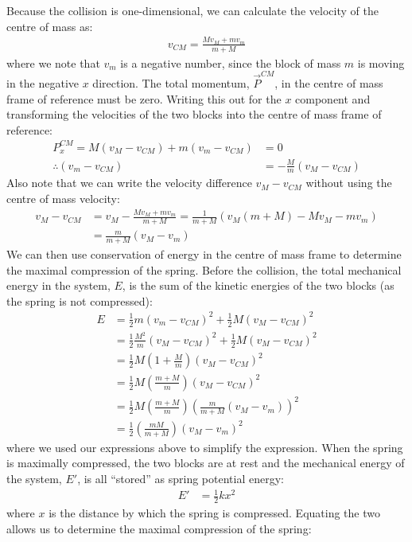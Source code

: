 \begin{example}
Because the collision is one-dimensional, we can calculate the velocity of the centre of mass as:
\begin{align*}
v_{CM} = \frac{Mv_M+mv_m}{m+M}
\end{align*}
where we note that $v_m$ is a negative number, since the block of mass $m$ is moving in the negative $x$ direction. The total momentum, $\vec P^{CM}$, in the centre of mass frame of reference must be zero. Writing this out for the $x$ component and transforming the velocities of the two blocks into the centre of mass frame of reference:
\begin{align*}
P^{CM}_x = M(v_M-v_{CM})+m(v_m-v_{CM})&=0\\
\therefore (v_m-v_{CM}) &= -\frac{M}{m}(v_M-v_{CM})
\end{align*}
Also note that we can write the velocity difference $v_M-v_{CM}$ without using the centre of mass velocity:
\begin{align*}
v_M-v_{CM} &= v_M-\frac{Mv_M+mv_m}{m+M}=\frac{1}{m+M}(v_M(m+M)-Mv_M-mv_m)\\
&=\frac{m}{m+M}(v_M-v_m)
\end{align*}
We can then use conservation of energy in the centre of mass frame to determine the maximal compression of the spring. Before the collision, the total mechanical energy in the system, $E$, is the sum of the kinetic energies of the two blocks (as the spring is not compressed):
\begin{align*}
E&=\frac{1}{2}m(v_m-v_{CM})^2+\frac{1}{2}M(v_M-v_{CM})^2\\
&=\frac{1}{2}\frac{M^2}{m}(v_M-v_{CM})^2+\frac{1}{2}M(v_M-v_{CM})^2\\
&=\frac{1}{2}M \left( 1 + \frac{M}{m}\right) (v_M-v_{CM})^2\\
&=\frac{1}{2}M \left(\frac{m+M}{m} \right)(v_M-v_{CM})^2\\
&=\frac{1}{2}M \left(\frac{m+M}{m} \right)\left(\frac{m}{m+M}(v_M-v_m)\right)^2\\
&=\frac{1}{2} \left(\frac{mM}{m+M}\right)(v_M-v_m)^2
\end{align*}
where we used our expressions above to simplify the expression. When the spring is maximally compressed, the two blocks are at rest and the mechanical energy of the system, $E'$, is all ``stored'' as spring potential energy:
\begin{align*}
E'&=\frac{1}{2}kx^2
\end{align*}
where $x$ is the distance by which the spring is compressed. Equating the two allows us to determine the maximal compression of the spring:

\end{example}
